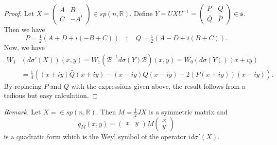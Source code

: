 \documentclass[12pt]{amsart}
\numberwithin{equation}{section}
\begin{document}
\begin{proof} Let $X=\left(\begin{smallmatrix} A&B\\
C&-A^t\end{smallmatrix}\right)\in sp(n,{\mathbb R})$. Define $Y=UXU^{-1}=
\left(\begin{smallmatrix} P&Q\\
{\bar Q}&{\bar P}\end{smallmatrix}\right)\in {\mathfrak s}$. Then we have
\begin{equation*}P=\tfrac{1}{2}(A+D+i(-B+C))\quad;\quad 
Q=\tfrac{1}{2}(A-D+i(B+C)).\end{equation*}
Now, we have
\begin{align*}W_1&(d\sigma'(X))(x,y)=W_1({\mathcal B}^{-1}d\sigma(Y){\mathcal B})(x,y)=
W_0(d\sigma(Y))(x+iy)\\
&=\tfrac{1}{4}((x+iy){\bar Q}(x+iy)-(x-iy)Q(x-iy)-2(P(x+iy))(x-iy)).
\end{align*}
By replacing $P$ and $Q$ with the expressions given above, the result follows from a tedious but easy calculation.
\end{proof}

\noindent \textit {Remark.} Let $X=\in sp(n,{\mathbb R})$. Then $M=\tfrac{1}{2}JX$ is a symmetric matrix and 
\begin{equation*}q_M(x,y)=\begin{pmatrix}x&y\end{pmatrix}M\begin{pmatrix}x\\y\end{pmatrix}
\end{equation*} is a quadratic form which is the Weyl symbol of the operator $id\sigma'(X)$.
\end{document}

